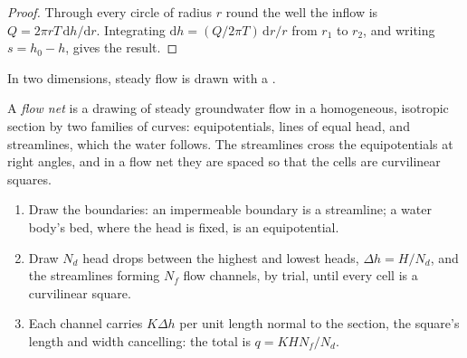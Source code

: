 \begin{proof}
Through every circle of radius $r$ round the well the inflow is $Q = 2\pi r
T\,\mathrm dh/\mathrm dr$. Integrating $\mathrm dh = (Q/2\pi T)\,\mathrm
dr/r$ from $r_1$ to $r_2$, and writing $s = h_0 - h$, gives the result.
\end{proof}

In two dimensions, steady flow is drawn with a .

\begin{definition}\label{def:b3:hydrogeology:flow-net}
A \emph{flow net} is a drawing of steady groundwater flow in
a homogeneous, isotropic section by two families of curves: equipotentials,
lines of equal head, and streamlines, which the water follows. The
streamlines cross the equipotentials at right angles, and in a flow net
they are spaced so that the cells are curvilinear squares.
\end{definition}

\begin{method}\label{met:b3:hydrogeology:flow-net}
\leavevmode
\begin{enumerate}
\item Draw the boundaries: an impermeable boundary is a streamline; a water
  body's bed, where the head is fixed, is an equipotential.
\item Draw $N_d$ head drops between the highest and lowest heads, $\Delta h
  = H/N_d$, and the streamlines forming $N_f$ flow channels, by trial,
  until every cell is a curvilinear square.
\item Each channel carries $K\Delta h$ per unit length normal to the
  section, the square's length and width cancelling: the total is $q =
  KHN_f/N_d$.
\end{enumerate}
\end{method}

